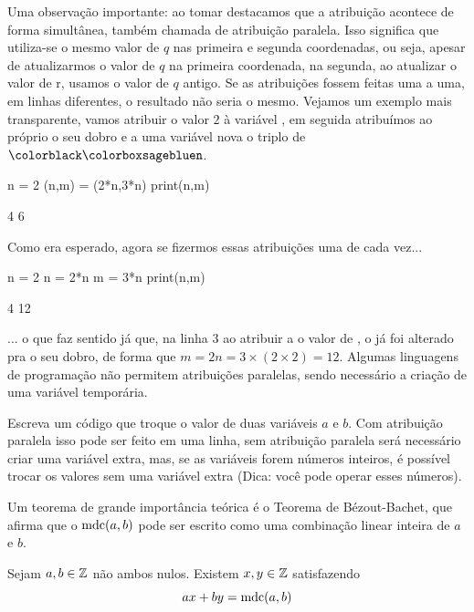 Uma observação importante: ao tomar
 destacamos que a atribuição
acontece de forma simultânea, também
chamada de atribuição paralela. Isso significa que 
utiliza-se o mesmo valor de $q$ nas primeira e segunda coordenadas,
ou seja, apesar de atualizarmos o valor de $q$ na primeira coordenada, 
na segunda, ao 
atualizar o valor de r, usamos o valor de $q$ antigo. Se
as atribuições fossem feitas uma a uma, em linhas diferentes, o 
resultado não seria o mesmo. Vejamos um exemplo mais 
transparente, vamos atribuir o valor $2$ à variável ,
em seguida atribuímos ao próprio  o seu dobro
e a uma variável nova  o triplo de $\ils{n}$.
\begin{sageinput}
n = 2
(n,m) = (2*n,3*n)
print(n,m)
\end{sageinput}
\begin{sageoutput}
4 6
\end{sageoutput}
Como era esperado, agora se fizermos essas atribuições 
uma de cada vez...
\begin{sageinput}
n = 2
n = 2*n
m = 3*n
print(n,m)
\end{sageinput}
\begin{sageoutput}
4 12
\end{sageoutput}
\noindent...  o que faz sentido já que, na linha $3$
ao atribuir a  o valor de , o  já foi alterado
pra o seu dobro, de forma que $m = 2n = 3\times (2\times2) = 12$. 
Algumas linguagens de programação não permitem atribuições paralelas,
sendo necessário a criação de uma variável temporária.

\begin{exercise}
  Escreva um código \Sage que troque o valor de duas 
  variáveis $a$ e $b$. Com atribuição paralela isso pode
  ser feito em uma linha, sem atribuição paralela
  será necessário criar uma variável extra, mas, se
  as variáveis forem números inteiros, é possível trocar
  os valores sem uma variável extra (Dica: você pode operar esses
  números).
\end{exercise}

Um teorema de grande importância teórica é o Teorema
de Bézout-Bachet, que afirma que o $\operatorname{mdc}(a,b)$ pode
ser escrito como uma combinação linear inteira de $a$ e $b$.

\begin{theorem}
\label{thm:bezout}
  Sejam $a, b \in \mathbb{Z}$ não ambos nulos. Existem $x,y \in \mathbb{Z}$
  satisfazendo
  $$
    ax+by = \operatorname{mdc}(a,b)
  $$
\end{theorem}


